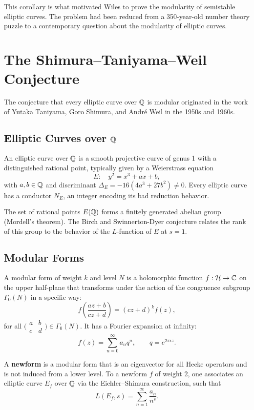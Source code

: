This corollary is what motivated Wiles to prove the modularity of semistable elliptic curves. The problem had been reduced from a 350-year-old number theory puzzle to a contemporary question about the modularity of elliptic curves.

\section{The Shimura--Taniyama--Weil Conjecture}

The conjecture that every elliptic curve over \(\mathbb{Q}\) is modular originated in the work of Yutaka Taniyama, Goro Shimura, and Andr\'e Weil in the 1950s and 1960s.

\subsection{Elliptic Curves over \texorpdfstring{\(\mathbb{Q}\)}{Q}}

An elliptic curve over \(\mathbb{Q}\) is a smooth projective curve of genus 1 with a distinguished rational point, typically given by a Weierstrass equation
\[
E: \quad y^2 = x^3 + ax + b,
\]
with \(a, b \in \mathbb{Q}\) and discriminant \(\Delta_E = -16(4a^3 + 27b^2) \neq 0\). Every elliptic curve has a conductor \(N_E\), an integer encoding its bad reduction behavior.

The set of rational points \(E(\mathbb{Q})\) forms a finitely generated abelian group (Mordell's theorem). The Birch and Swinnerton-Dyer conjecture relates the rank of this group to the behavior of the \(L\)-function of \(E\) at \(s = 1\).

\subsection{Modular Forms}

A modular form of weight \(k\) and level \(N\) is a holomorphic function \(f: \mathcal{H} \to \mathbb{C}\) on the upper half-plane that transforms under the action of the congruence subgroup \(\Gamma_0(N)\) in a specific way:
\[
f\left(\frac{az + b}{cz + d}\right) = (cz + d)^k f(z),
\]
for all \(\bigl(\begin{smallmatrix}a&b\\c&d\end{smallmatrix}\bigr) \in \Gamma_0(N)\). It has a Fourier expansion at infinity:
\[
f(z) = \sum_{n=0}^\infty a_n q^n, \qquad q = e^{2\pi i z}.
\]

A \textbf{newform} is a modular form that is an eigenvector for all Hecke operators and is not induced from a lower level. To a newform \(f\) of weight 2, one associates an elliptic curve \(E_f\) over \(\mathbb{Q}\) via the Eichler--Shimura construction, such that
\[
L(E_f, s) = \sum_{n=1}^\infty \frac{a_n}{n^s}.
\]

